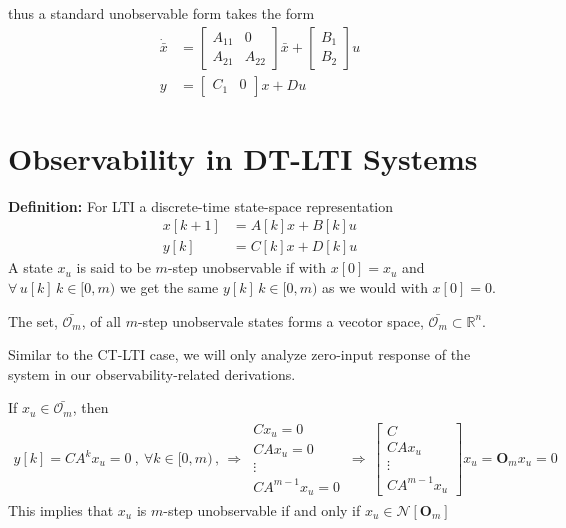 \documentclass[twoside]{article}
\begin{document}
%
thus a standard unobservable form takes the form
%
\begin{align*}
\dot{\bar{x}} &= \left[ \begin{array}{c|c} A_{11} & 0 \\ \hline A_{21} & A_{22}  \end{array} \right] \bar{x} + \left[ \begin{array}{c} B_1 \\ B_2 \end{array} \right] u
\\
y &= \left[ \begin{array}{c|c} C_1 & 0 \end{array} \right] x + D u
\end{align*}

\section{Observability in DT-LTI Systems}

\textbf{Definition:} For LTI a discrete-time state-space representation
%
\begin{align*}
  x[k+1] &= A[k] x + B[k] u
\\
  y[k] &= C[k] x + D[k] u
\end{align*}
%
A state $x_u$ is said to be $m$-step unobservable 
if with $x[0] = x_u$ and $\forall \, u[k] \, k \in [0,m)$ we get the same $y[k] \, k \in [0,m)$ as we would with $x[0] = 0$. 

The set, $\bar{\mathcal{O}_m}$, of all $m$-step unobservale states forms a vecotor space, $\bar{\mathcal{O}_m} \subset 
\mathbb{R}^n$.

Similar to the CT-LTI case, we will only analyze zero-input response of the system in our 
observability-related derivations. 

If $x_u \in \bar{\mathcal{O}_m}$, then 
%
\begin{align*}
y[k] = C A^k x_u = 0 \ , \ \forall k \in [0,m)
\, , \, \Rightarrow \, \begin{array}{c} C x_u = 0 
\\
C A x_u = 0
\\
\vdots
\\
C A^{m-1} x_u = 0
\end{array}
\, \Rightarrow \, 
\left[ \begin{array}{c} C 
\\
C A x_u 
\\
\vdots
\\
C A^{m-1} x_u 
\end{array} \right] x_u = \mathbf{O}_m x_u = 0
\end{align*}
%
This implies that $x_u$ is $m$-step unobservable if and only if
$x_u \in \mathcal{N}[ \mathbf{O}_m ]$
\end{document}
